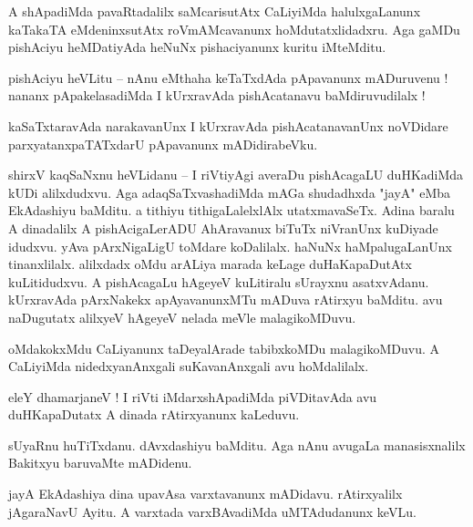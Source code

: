 \documentclass{article}
\begin{document}
\begin{mn}%
A shApadiMda pavaRtadalilx saMcarisutAtx CaLiyiMda halulxgaLanunx kaTakaTA eMdeninxsutAtx 
roVmAMcavanunx hoMdutatxlidadxru. Aga gaMDu pishAciyu heMDatiyAda heNuNx pishaciyanunx kuritu 
iMteMditu.
\end{mn}

\begin{mn}%
pishAciyu heVLitu -- nAnu eMthaha keTaTxdAda pApavanunx mADuruvenu ! nananx pApakelasadiMda I 
kUrxravAda pishAcatanavu baMdiruvudilalx !
\end{mn}

\begin{mn}%
kaSaTxtaravAda narakavanUnx I kUrxravAda pishAcatanavanUnx noVDidare parxyatanxpaTATxdarU 
pApavanunx mADidirabeVku.
\end{mn}

\begin{mn}%
shirxV kaqSaNxnu heVLidanu -- I riVtiyAgi averaDu pishAcagaLU duHKadiMda kUDi alilxdudxvu. Aga 
adaqSaTxvashadiMda mAGa shudadhxda "jayA" eMba EkAdashiyu baMditu. a tithiyu tithigaLalelxlAlx 
utatxmavaSeTx. Adina baralu A dinadalilx A pishAcigaLerADU AhAravanux biTuTx niVranUnx kuDiyade 
idudxvu. yAva pArxNigaLigU toMdare koDalilalx. haNuNx haMpalugaLanUnx tinanxlilalx. alilxdadx oMdu 
arALiya marada keLage duHaKapaDutAtx kuLitidudxvu. A pishAcagaLu hAgeyeV kuLitiralu sUrayxnu 
asatxvAdanu. kUrxravAda pArxNakekx apAyavanunxMTu mADuva rAtirxyu baMditu. avu naDugutatx alilxyeV 
hAgeyeV nelada meVle malagikoMDuvu.
\end{mn}

\begin{mn}%
oMdakokxMdu CaLiyanunx taDeyalArade tabibxkoMDu malagikoMDuvu. A CaLiyiMda nidedxyanAnxgali 
suKavanAnxgali avu hoMdalilalx.
\end{mn}

\begin{mn}%
eleY dhamarjaneV ! I riVti iMdarxshApadiMda piVDitavAda avu duHKapaDutatx A dinada rAtirxyanunx 
kaLeduvu.
\end{mn}

\begin{mn}%
sUyaRnu huTiTxdanu. dAvxdashiyu baMditu. Aga nAnu avugaLa manasisxnalilx Bakitxyu baruvaMte mADidenu.
\end{mn}

\begin{mn}%
jayA EkAdashiya dina upavAsa varxtavanunx mADidavu. rAtirxyalilx jAgaraNavU Ayitu. A varxtada 
varxBAvadiMda uMTAdudanunx keVLu.
\end{mn}
\end{document}
